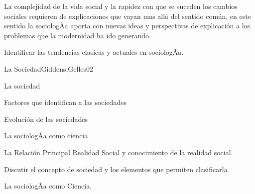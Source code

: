 \begin{syllabus}


\begin{justification}
La complejidad de la vida social y la rapidez con que se suceden los cambios sociales requieren 
de explicaciones que vayan mas allá del sentido común, en este sentido la sociologÃ­a 
aporta con nuevas ideas y perspectivas de explicación a los problemas que la modernidad 
ha ido generando.
\end{justification}

\begin{goals}
\item Identificar las tendencias clasicas y actuales en sociologÃ­a.
\end{goals}

\begin{outcomes}
\end{outcomes}

\begin{unit}{La Sociedad}{Giddens,Gelles}{0}{2}
    \begin{topics}
      \item La sociedad
      \item Factores que identifican a las sociedades
      \item Evolución de las sociedades
      \item La sociologÃ­a como ciencia
      \item La Relación Principal Realidad Social y conocimiento de la realidad social.
    \end{topics}
    \begin{unitgoals}
      \item Discutir el concepto de sociedad y los elementos que permiten clasificarla
      \item La sociologÃ­a como Ciencia.
    \end{unitgoals}
\end{unit}


\end{syllabus}
